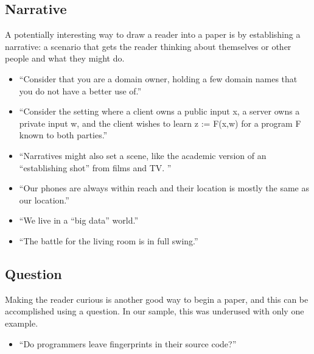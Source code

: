\documentclass[sigconf,anonymous]{acmart}
\begin{document}
	\subsection{Narrative}
	
	A potentially interesting way to draw a reader into a paper is by establishing a narrative: a scenario that gets the reader thinking about themselves or other people and what they might do.  
	\begin{itemize}
		\item 	``Consider that you are a domain owner, holding a few domain names that you do not have a better use of.''
		
		\item 	``Consider the setting where a client owns a public input x, a server owns a private input w, and the client wishes to learn z := F(x,w) for a program F known to both parties.''
		
		\item 	``Narratives might also set a scene, like the academic version of an “establishing shot” from films and TV. ''
		
		\item 	``Our phones are always within reach and their location is mostly the same as our location.''
		
		\item 	``We live in a “big data” world.''
		
		\item 	``The battle for the living room is in full swing.''
	\end{itemize}
	
	
	\subsection{Question} 
	
	Making the reader curious is another good way to begin a paper, and this can be accomplished using a question. In our sample, this was underused with only one example.
	\begin{itemize}
		\item ``Do programmers leave fingerprints in their source code?''
	\end{itemize}
	
\end{document}
